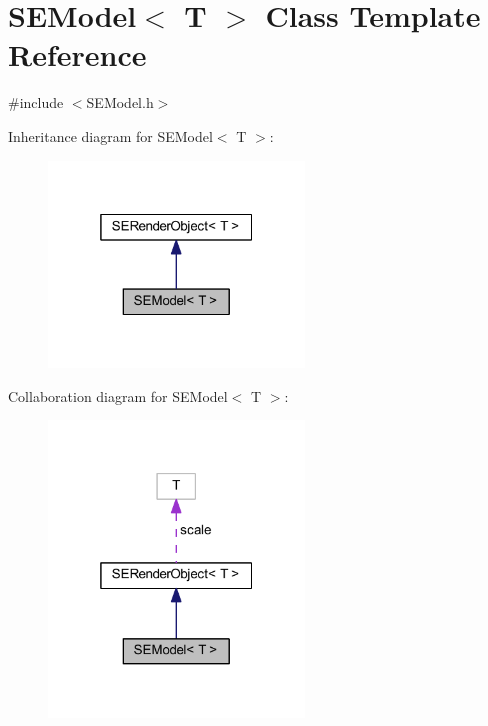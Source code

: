 \section{S\+E\+Model$<$ T $>$ Class Template Reference}
\label{class_s_e_model}


{\ttfamily \#include $<$S\+E\+Model.\+h$>$}



Inheritance diagram for S\+E\+Model$<$ T $>$\+:
\nopagebreak
\begin{figure}[H]
\begin{center}
\leavevmode
\includegraphics[width=193pt]{class_s_e_model__inherit__graph}
\end{center}
\end{figure}


Collaboration diagram for S\+E\+Model$<$ T $>$\+:
\nopagebreak
\begin{figure}[H]
\begin{center}
\leavevmode
\includegraphics[width=193pt]{class_s_e_model__coll__graph}
\end{center}
\end{figure}
